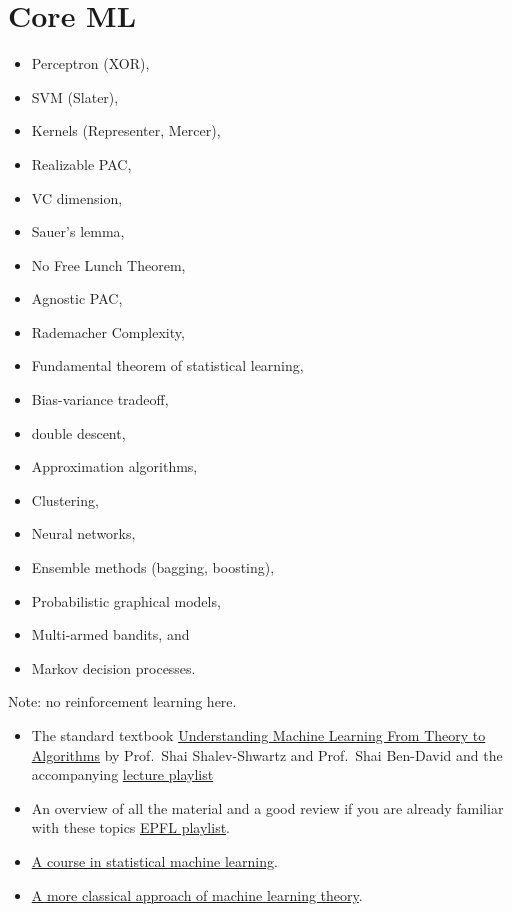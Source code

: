 \hypertarget{core-ml}{%
\section{Core ML}\label{core-ml}}

\begin{itemize}
\tightlist
\item
  Perceptron (XOR),
\item
  SVM (Slater),
\item
  Kernels (Representer, Mercer),
\item
  Realizable PAC,
\item
  VC dimension,
\item
  Sauer's lemma,
\item
  No Free Lunch Theorem,
\item
  Agnostic PAC,
\item
  Rademacher Complexity,
\item
  Fundamental theorem of statistical learning,
\item
  Bias-variance tradeoff,
\item
  double descent,
\item
  Approximation algorithms,
\item
  Clustering,
\item
  Neural networks,
\item
  Ensemble methods (bagging, boosting),
\item
  Probabilistic graphical models,
\item
  Multi-armed bandits, and
\item
  Markov decision processes.
\end{itemize}

Note: no reinforcement learning here.

\begin{itemize}
\tightlist
\item
  The standard textbook
  \href{https://cs.huji.ac.il/~shais/UnderstandingMachineLearning/understanding-machine-learning-theory-algorithms.pdf}{Understanding
  Machine Learning From Theory to Algorithms} by Prof.~Shai
  Shalev-Shwartz and Prof.~Shai Ben-David and the accompanying
  \href{https://www.youtube.com/playlist?list=PLPW2keNyw-usgvmR7FTQ3ZRjfLs5jT4BO}{lecture
  playlist}
\item
  An overview of all the material and a good review if you are already
  familiar with these topics
  \href{https://www.youtube.com/playlist?list=PLie7a1OUTSagZB9mFZnVBgsNfBtcUGJWB}{EPFL
  playlist}.
\item
  \href{https://www.youtube.com/playlist?list=PL05umP7R6ij2XCvrRzLokX6EoHWaGA2cC}{A
  course in statistical machine learning}.
\item
  \href{https://www.youtube.com/playlist?list=PLD0F06AA0D2E8FFBA}{A more
  classical approach of machine learning theory}.
\end{itemize}

